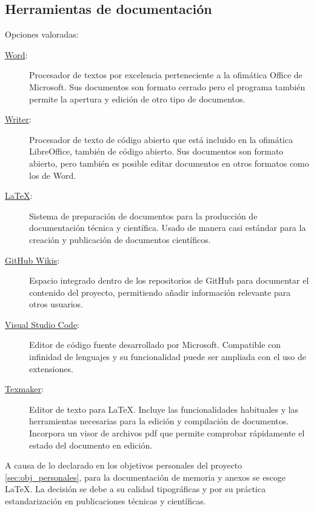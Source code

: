 \subsection{Herramientas de documentación}{\label{sec:docs}}
Opciones valoradas:
\begin{description}
  \item[\href{https://products.office.com/es-es/word}{Word}:] Procesador de
  textos por excelencia perteneciente a la  ofimática
  Office de Microsoft. Sus documentos son formato cerrado pero el programa
  también permite la apertura y edición de otro tipo de documentos.
  \item[\href{https://es.libreoffice.org/descubre/writer/}{Writer}:] Procesador
  de texto de código abierto que está incluido en la 
  ofimática LibreOffice, también de código abierto. Sus documentos son formato
  abierto, pero también es posible editar documentos en otros formatos como los
  de Word.
  \item[\href{https://www.latex-project.org/}{\LaTeX}:] Sistema de preparación de
  documentos para la producción de documentación técnica y científica. Usado de
  manera casi estándar para la creación y publicación de documentos científicos.
  \item[\href{https://help.github.com/articles/about-wikis/}{GitHub Wikis}:] 
  Espacio integrado dentro de los repositorios de GitHub para documentar el
  contenido del proyecto, permitiendo añadir información relevante para otros
  usuarios.
  \item[\href{https://code.visualstudio.com/}{Visual Studio Code}:] Editor de
   código fuente desarrollado por Microsoft. Compatible con infinidad de
   lenguajes y su funcionalidad puede ser ampliada con el uso de extensiones.
  \item[\href{http://www.xm1math.net/texmaker/}{Texmaker}:] Editor de texto
  para \LaTeX. Incluye las funcionalidades habituales y las herramientas
  necesarias para la edición y compilación de documentos. Incorpora un visor
  de archivos pdf que permite comprobar rápidamente el estado del documento en
  edición.
\end{description}

A causa de lo declarado en los objetivos personales del proyecto
\ref{sec:obj_personales}, para la documentación de memoria y anexos se escoge
\LaTeX. La decisión se debe a su calidad tipográficas y por su práctica
estandarización en publicaciones técnicas y científicas.

